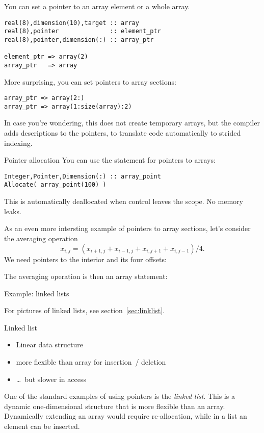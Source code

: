 You can set a pointer to an array element or a whole array.
\begin{lstlisting}
real(8),dimension(10),target :: array
real(8),pointer              :: element_ptr
real(8),pointer,dimension(:) :: array_ptr

element_ptr => array(2)
array_ptr   => array
\end{lstlisting}
More surprising, you can set pointers to array sections:
\begin{lstlisting}
array_ptr => array(2:)
array_ptr => array(1:size(array):2)
\end{lstlisting}

In case you're wondering, this does not create temporary arrays, but
the compiler adds descriptions to the pointers, to translate code
automatically to strided indexing.

\begin{block}{Pointer allocation}
  \label{sl:fpoint-dynamic}
  You can use the  statement for pointers to arrays:
\begin{lstlisting}
Integer,Pointer,Dimension(:) :: array_point
Allocate( array_point(100) )
\end{lstlisting}  
  This is automatically deallocated when control leaves the scope.
  No memory leaks.
\end{block}

As an even more intersting  example of pointers to array sections,
let's consider the averaging operation
\[ x_{i,j} = ( x_{i+1,j}+x_{i-1,j}+x_{i,j+1}+x_{i,j-1} )/4. \]
We need pointers to the interior and its four offsets:

The averaging operation is then an array statement:

 {Example: linked lists}
\label{sec:linkf}

For pictures of linked lists, see section~\ref{sec:linklist}.

\begin{block}{Linked list}
  \label{sl:flink1}
  \begin{itemize}
  \item Linear data structure
  \item more flexible than array for insertion~/ deletion
  \item \ldots~but slower in access
  \end{itemize}
\end{block}

One of the standard examples of using pointers is the
\emph{linked list}. This is a dynamic one-dimensional structure
that is more flexible than an array. Dynamically extending an array
would require re-allocation, while in a list an element can be
inserted.

